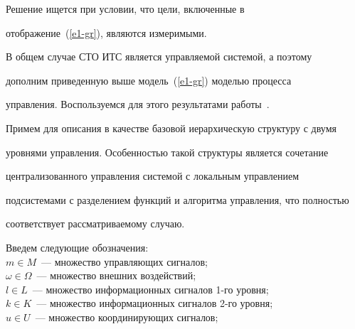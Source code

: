  Решение ищется при условии, что цели, включенные в 


отображение~(\ref{e1-gr}), являются измеримыми. 


  


  В общем случае СТО ИТС является управляемой системой, а поэтому 


дополним приведенную выше модель~(\ref{e1-gr}) моделью процесса 


управления. Воспользуемся для этого результатами работы~\cite{24-gr}.


  


  Примем для описания в качестве базовой иерархическую структуру с двумя 


уровнями управления. Особенностью такой структуры является сочетание 


централизованного управления системой с локальным управлением 


подсистемами с разделением функций и алгоритма управления, что полностью 


соответствует рассматриваемому случаю.


  


  Введем следующие обозначения:\\[-9pt]


  


  $m\in M$~--- множество управляющих сигналов;\\[-9pt]


  


  $\omega \in \Omega$~--- множество внешних воздействий;\\[-9pt]


  


  $l\in L$~--- множество информационных сигналов 1-го уровня; \\[-9pt]


  


  $k\in K$~--- множество информационных сигналов 2-го уровня;\\[-9pt]


  


  $u\in U$~--- множество координирующих сигналов;\\[-9pt]


